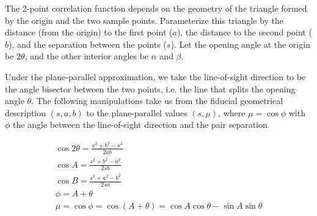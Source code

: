 \documentclass{article}
\begin{document}
The 2-point correlation function depends on the geometry of the triangle formed
by the origin and the two sample points.  Parameterize this triangle by the
distance (from the origin) to the first point ($a$), the distance to the second
point ($b$), and the separation between the points ($s$).  Let the opening angle
at the origin be $2\theta$, and the other interior angles be $\alpha$ and $\beta$.

Under the plane-parallel approximation, we take the line-of-sight direction to
be the angle bisector between the two points, i.e. the line that splits the
opening angle $\theta$.  The following manipulations take us from the fiducial
geometrical description $(s,a,b)$ to the plane-parallel values $(s,\mu)$, where
$\mu = \cos\phi$ with $\phi$ the angle between the line-of-sight direction and
the pair separation.

\begin{gather*}
    \cos2\theta = \frac{a^2 + b^2 - s^2}{2ab} \\
    \cos A = \frac{s^2 + b^2 - a^2}{2sb} \\
    \cos B = \frac{s^2 + a^2 - b^2}{2sa} \\
    \phi = A + \theta \\
    \mu = \cos\phi = \cos(A + \theta) = \cos A \cos\theta - \sin A \sin\theta
\end{gather*}
\end{document}
